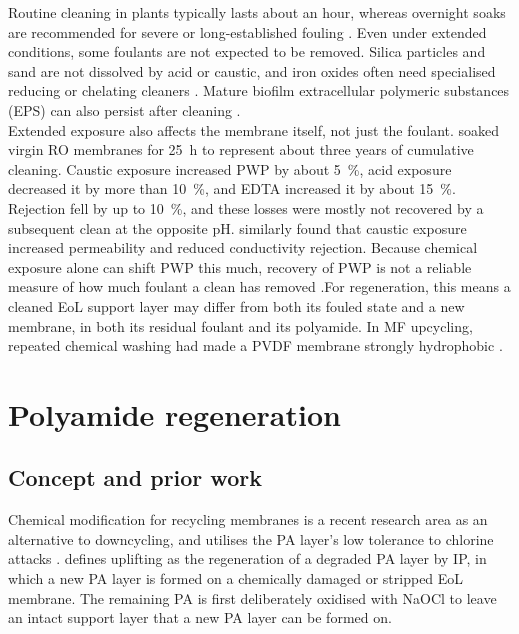 Routine cleaning in plants typically lasts about an hour, whereas overnight soaks are recommended for severe or long-established fouling \citep{DuPont2026}. Even under extended conditions, some foulants are not expected to be removed. Silica particles and sand are not dissolved by acid or caustic, and iron oxides often need specialised reducing or chelating cleaners \citep{MembraneWorks2026Mine}. Mature biofilm extracellular polymeric substances (EPS) can also persist after cleaning \citep{MohiuddinAhmed2010}.\\

Extended exposure also affects the membrane itself, not just the foulant. \citet{tu2015chemical} soaked virgin RO membranes for \qty{25}{\hour} to represent about three years of cumulative cleaning. Caustic exposure increased PWP by about \qty{5}{\percent}, acid exposure decreased it by more than \qty{10}{\percent}, and EDTA increased it by about \qty{15}{\percent}. Rejection fell by up to \qty{10}{\percent}, and these losses were mostly not recovered by a subsequent clean at the opposite pH. \citet{fujioka2014nitrosamine} similarly found that caustic exposure increased permeability and reduced conductivity rejection. Because chemical exposure alone can shift PWP this much, recovery of PWP is not a reliable measure of how much foulant a clean has removed \citep{tu2015chemical}.For regeneration, this means a cleaned EoL support layer may differ from both its fouled state and a new membrane, in both its residual foulant and its polyamide. In MF upcycling, repeated chemical washing had made a PVDF membrane strongly hydrophobic \citep{Khanzada2024}.






\section{Polyamide regeneration}
\label{sec:uplifting}

\subsection{Concept and prior work}
\label{sec:uplifting-concept}
Chemical modification for recycling membranes is a recent research area as an alternative to downcycling, and utilises the PA layer's low tolerance to chlorine attacks \citep{GarciaPacheco2015}. \citet{Ogbe2025} defines uplifting as the regeneration of a degraded PA layer by IP, in which a new PA layer is formed on a chemically damaged or stripped EoL membrane. The remaining PA is first deliberately oxidised with NaOCl to leave an intact support layer that a new PA layer can be formed on.

